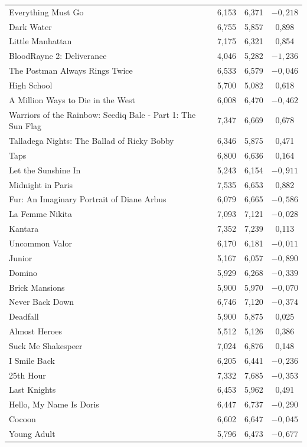 \documentclass[11pt,a4paper]{article}
\begin{document}
{\begin{longtable}{p{5.8cm}ccc}
Everything Must Go & 6{,}153 & 6{,}371 & $-0{,}218$ \\
Dark Water & 6{,}755 & 5{,}857 & 0{,}898 \\
Little Manhattan & 7{,}175 & 6{,}321 & 0{,}854 \\
BloodRayne 2: Deliverance & 4{,}046 & 5{,}282 & $-1{,}236$ \\
The Postman Always Rings Twice & 6{,}533 & 6{,}579 & $-0{,}046$ \\
High School & 5{,}700 & 5{,}082 & 0{,}618 \\
A Million Ways to Die in the West & 6{,}008 & 6{,}470 & $-0{,}462$ \\
Warriors of the Rainbow: Seediq Bale - Part 1: The Sun Flag & 7{,}347 & 6{,}669 & 0{,}678 \\
Talladega Nights: The Ballad of Ricky Bobby & 6{,}346 & 5{,}875 & 0{,}471 \\
Taps & 6{,}800 & 6{,}636 & 0{,}164 \\
Let the Sunshine In & 5{,}243 & 6{,}154 & $-0{,}911$ \\
Midnight in Paris & 7{,}535 & 6{,}653 & 0{,}882 \\
Fur: An Imaginary Portrait of Diane Arbus & 6{,}079 & 6{,}665 & $-0{,}586$ \\
La Femme Nikita & 7{,}093 & 7{,}121 & $-0{,}028$ \\
Kantara & 7{,}352 & 7{,}239 & 0{,}113 \\
Uncommon Valor & 6{,}170 & 6{,}181 & $-0{,}011$ \\
Junior & 5{,}167 & 6{,}057 & $-0{,}890$ \\
Domino & 5{,}929 & 6{,}268 & $-0{,}339$ \\
Brick Mansions & 5{,}900 & 5{,}970 & $-0{,}070$ \\
Never Back Down & 6{,}746 & 7{,}120 & $-0{,}374$ \\
Deadfall & 5{,}900 & 5{,}875 & 0{,}025 \\
Almost Heroes & 5{,}512 & 5{,}126 & 0{,}386 \\
Suck Me Shakespeer & 7{,}024 & 6{,}876 & 0{,}148 \\
I Smile Back & 6{,}205 & 6{,}441 & $-0{,}236$ \\
25th Hour & 7{,}332 & 7{,}685 & $-0{,}353$ \\
Last Knights & 6{,}453 & 5{,}962 & 0{,}491 \\
{Hello, My Name Is Doris} & 6{,}447 & 6{,}737 & $-0{,}290$ \\
Cocoon & 6{,}602 & 6{,}647 & $-0{,}045$ \\
Young Adult & 5{,}796 & 6{,}473 & $-0{,}677$ \\
\end{longtable}
}
\end{document}
